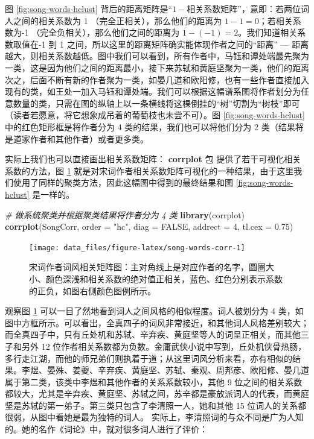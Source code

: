 \documentclass[
  b5paper,
  UTF8,twoside]{book}
\newenvironment{Shaded}{\begin{snugshade}}{\end{snugshade}}
\newcommand{\AttributeTok}[1]{\textcolor[rgb]{0.13,0.29,0.53}{#1}}
\newcommand{\CommentTok}[1]{\textcolor[rgb]{0.56,0.35,0.01}{\textit{#1}}}
\newcommand{\ConstantTok}[1]{\textcolor[rgb]{0.56,0.35,0.01}{#1}}
\newcommand{\DecValTok}[1]{\textcolor[rgb]{0.00,0.00,0.81}{#1}}
\newcommand{\FloatTok}[1]{\textcolor[rgb]{0.00,0.00,0.81}{#1}}
\newcommand{\FunctionTok}[1]{\textcolor[rgb]{0.13,0.29,0.53}{\textbf{#1}}}
\newcommand{\NormalTok}[1]{#1}
\newcommand{\StringTok}[1]{\textcolor[rgb]{0.31,0.60,0.02}{#1}}
\begin{document}
图 \ref{fig:song-words-hclust} 背后的距离矩阵是``\(1-\text{相关系数矩阵}\)''，意即：若两位词人之间的相关系数为 1 （完全正相关），那么他们的距离为 \(1-1=0\)；若相关系数为-1 （完全负相关），那么他们之间的距离为 \(1-(-1)=2\)。我们知道相关系数取值在-1 到 1 之间，所以这里的距离矩阵确实能体现作者之间的``距离'' --- 距离越大，则相关系数越低。图中我们可以看到，所有作者中，马钰和谭处端最先聚为一类，这是因为他们之间的距离最小，接下来苏轼和黄庭坚聚为一类，他们的距离次之，后面不断有新的作者聚为一类，如晏几道和欧阳修，也有一些作者直接加入现有的类，如王处一加入马钰和谭处端。我们可以根据这幅谱系图将作者划分为任意数量的类，只需在图的纵轴上以一条横线将这棵倒挂的``树''切割为``树枝''即可（读者若愿意，将它想象成吊着的葡萄枝也未尝不可）。图 \ref{fig:song-words-hclust} 中的红色矩形框是将作者分为 4 类的结果，我们也可以将他们分为 2 类（结果将是道家作者和其他作者）或者更多类。

实际上我们也可以直接画出相关系数矩阵： \textbf{corrplot} 包 \citep{corrplot} 提供了若干可视化相关系数的方法，图 \ref{fig:song-words-corr} 就是对宋词作者相关系数矩阵可视化的一种结果，由于这里我们使用了同样的聚类方法，因此这幅图中得到的最终结果和图 \ref{fig:song-words-hclust} 是一样的。

\begin{Shaded}
\begin{Highlighting}[]
\CommentTok{\# 做系统聚类并根据聚类结果将作者分为 4 类}
\FunctionTok{library}\NormalTok{(corrplot)}
\FunctionTok{corrplot}\NormalTok{(SongCorr, }\AttributeTok{order =} \StringTok{"hc"}\NormalTok{, }\AttributeTok{diag =} \ConstantTok{FALSE}\NormalTok{, }\AttributeTok{addrect =} \DecValTok{4}\NormalTok{, }\AttributeTok{tl.cex =} \FloatTok{0.75}\NormalTok{)}
\end{Highlighting}
\end{Shaded}

\begin{figure}

{\centering \texttt{[image: data\_files/figure-latex/song-words-corr-1]} 

}

\caption[ 宋词作者词风相关矩阵图 ]{宋词作者词风相关矩阵图：主对角线上是对应作者的名字，圆圈大小、颜色深浅和相关系数的绝对值正相关，蓝色、红色分别表示系数的正负，如图右侧颜色图例所示。}\label{fig:song-words-corr}
\end{figure}



观察图 \ref{fig:song-words-corr} 可以一目了然地看到词人之间风格的相似程度。词人被划分为 4 类，如图中方框所示。可以看出，全真四子的词风非常接近，和其他词人风格差别较大； 而全真四子中，只有丘处机和苏轼、辛弃疾、黄庭坚等人的词呈正相关，而其他三子和另外 12 位作者相关系数都为负数。金庸武侠小说中写到，丘处机侠骨热肠，多行走江湖，而他的师兄弟们则执着于道；从这里词风分析来看，亦有相似的结果。李煜、晏殊、姜夔、辛弃疾、黄庭坚、苏轼、秦观、周邦彦、欧阳修、晏几道属于第二类，该类中李煜和其他作者的关系系数较小，其他 9 位之间的相关系数都较大，尤其是辛弃疾、黄庭坚、苏轼之间，苏辛都是豪放派词人的代表，而黄庭坚是苏轼的第一弟子。第三类只包含了李清照一人，她和其他 15 位词人的关系都很弱，从图中看她是最为独特的词人。 实际上，李清照词的与众不同是广为人知的。她的名作《词论》中，就对很多词人进行了评价：
\end{document}
